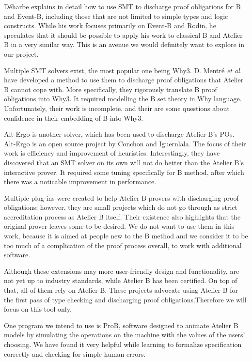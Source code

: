 \documentclass[12pt,journal,duplex]{IEEEtran}
\begin{document}
	D\'{e}harbe explains in detail how to use SMT to discharge proof obligations for B and Event-B, including those that are not limited to simple types and logic constructs. While his work focuses primarily on Event-B and Rodin, he speculates that it should be possible to apply his work to classical B and Atelier B in a very similar way.\cite{SMT} This is an avenue we would definitely want to explore in our project.
	
	Multiple SMT solvers exist, the most popular one being Why3. D. Mentr\'{e} \emph{et al.} have developed a method to use them to discharge proof obligations that Atelier B cannot cope with. More specifically, they rigorously translate B proof obligations into Why3. It required modelling the B set theory in Why language. Unfortunately, their work is incomplete, and their are some questions about confidence in their embedding of B into Why3.
	
	Alt-Ergo is another solver, which has been used to discharge Atelier B's POs.\cite{Alt-Ergo} Alt-Ergo is an open source project by Conchon and Iguernlala. The focus of their work is efficiency and improvement of heuristics. Interestingly, they have discovered that an SMT solver on its own will not do better than the Atelier B's interactive prover. It required some tuning specifically for B method, after which there was a noticable improvement in performance.
	
	Multiple plug-ins were created to help Atelier B provers with discharging proof obligations; however, they are small projects which do not go through as strict accreditation process as Atelier B itself. Their existence also highlights that the original prover leaves some to be desired. We do not want to use them in this work, because it is aimed at people new to the B method and we consider it to be too much of a complication of the proof process overall, to work with additional software.\cite{BEval}\cite{BWare}
	
	Although these extensions may more user-friendly design and functionality, are not yet up to industry standards, while Atelier B has been certified. On top of that, all of them rely on Atelier B. These projects advocate using Atelier B for the first pass of type checking and discharging proof obligations.Therefore we will focus on this tool only.
	
	One program we intend to use is ProB, software designed to animate Atelier B models by simulating the operations on the machine with the values of the users' choosing. We have found it very helpful while learning to formalize specification correctly and checking for simple human errors.\cite{proB}
	
\end{document}
